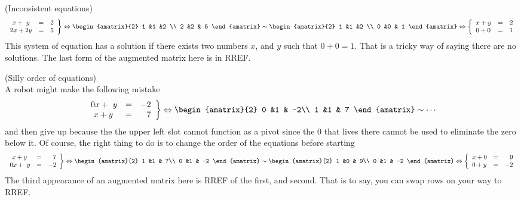 \begin{example} (Inconsistent equations)
\[
   \left.
\begin{array}{lcr}
	\ x + \ y & = & 2 \\
	2x + 2y & = &  5
     \end{array}
   \right\} 
   \Leftrightarrow
\begin{amatrix}{2}
1 &1 &2 \\ 2 &2 & 5
\end{amatrix}
\sim
\begin{amatrix}{2}
1 &1 &2 \\ 0 &0 & 1
\end{amatrix}
\Leftrightarrow
\left\{
\begin{array}{lcr}
	x + y & = & 2 \\
	 0 + 0 & = &  1
     \end{array}
   \right.
\]
This system of equation has a solution if there exists two numbers $x$, and $y$ such that $0+0=1$. That is a tricky way of saying there are no solutions. The last form of the augmented matrix here is in RREF.
\end{example}


\begin{example} (Silly order of equations)\\
A robot might make the following mistake
\[
   \left.
\begin{array}{lcr}
	0x +  \ y & = & -2 \\
	\ x + y & = &  7
     \end{array}
   \right\} 
   \Leftrightarrow 
\begin{amatrix}{2}
0 &1 & -2\\ 1 &1 & 7
\end{amatrix}
\sim \cdots
\]
and then give up because the the upper left slot cannot function as a pivot since the 0 that lives there cannot be used to eliminate the zero below it. Of course, the right thing to do is to change the order of the equations before starting
\[
   \left.
\begin{array}{lcr}
	\ x + y & = &  7
	\\
	0x +  \ y & = & -2 
	     \end{array}
   \right\} 
   \Leftrightarrow
\begin{amatrix}{2}
1 &1 & 7\\ 0 &1 & -2
\end{amatrix}
\sim 
\begin{amatrix}{2}
1 &0 & 9\\ 0 &1 & -2
\end{amatrix}
\Leftrightarrow
\left\{
\begin{array}{lcr}
	x + 0 & = & 9 \\
	 0 + y & = & -2
     \end{array}
   \right.
\]
The third appearance of an augmented matrix here is RREF of the first, and second. That is to say, you can swap rows on your way to RREF.
\end{example}



